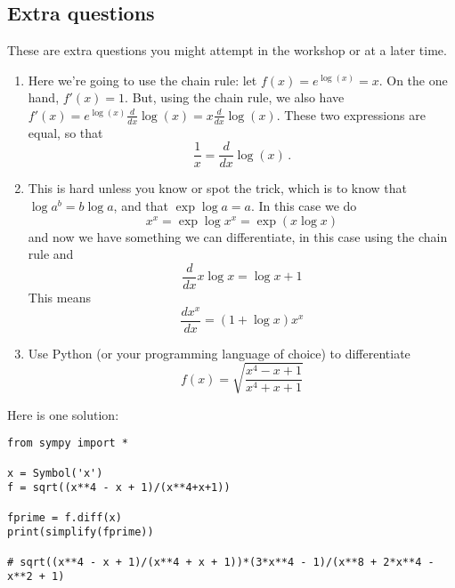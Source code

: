 \documentclass[11pt,a4paper]{scrartcl}
\begin{document}
\subsection*{Extra questions}

These are extra questions you might attempt in the workshop or at a later time.

\begin{enumerate}
\item Here we're going to use the chain rule: let $f(x) = e^{\log(x)} = x$.
On the one hand, $f'(x)=1$. But, using the chain rule, we also have $f'(x) = e^{\log(x)}\frac{d}{dx}\log(x)= x \frac{d}{dx}\log(x)$.
These two expressions are equal, so that 
\[
\frac1x = \frac{d}{dx}\log(x)\,.
\]

\item This is hard unless you know or spot the trick, which is to know that $\log a^b=b\log a$, and that $\exp{\log{a}}=a$. In this case we do
\begin{equation}
  x^x=\exp{\log{x^x}}=\exp{\left(x\log{x}\right)}
\end{equation}
and now we have something we can differentiate, in this case using the chain rule and
\begin{equation}
  \frac{d}{dx}x\log{x}=\log{x}+1
\end{equation}
This means
\begin{equation}
  \frac{dx^x}{dx}=(1+\log{x})x^x
\end{equation}

\item Use Python (or your programming language of choice) to differentiate
\[
f(x) = \sqrt{\frac{x^4-x+1}{x^4+x+1}}
\]
\end{enumerate}

Here is one solution:
\begin{verbatim}
from sympy import *

x = Symbol('x')
f = sqrt((x**4 - x + 1)/(x**4+x+1))

fprime = f.diff(x)
print(simplify(fprime))

# sqrt((x**4 - x + 1)/(x**4 + x + 1))*(3*x**4 - 1)/(x**8 + 2*x**4 - x**2 + 1)
    
\end{verbatim}
\end{document}
